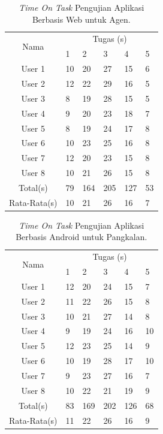 \begin{table}[H]
	\center
	\caption{\textit{Time On Task} Pengujian Aplikasi Berbasis Web untuk Agen.}
	\label{timeOnTaskAgen}
	\begin{tabular}{|c|l|l|l|l|l|}
		\hline
		\multirow{2}{*}{Nama} & \multicolumn{5}{c|}{Tugas (s)} \\ \cline{2-6} 
		&1 &2  &3 &4 &5  \\
		\hline
		User 1 &10 &20 &27 &15 &6  \\ 
		\hline
		User 2 &12 &22 &29 &16 &5  \\ 
		\hline
		User 3 &8 &19 &28 &15 &5  \\ 
		\hline
		User 4 &9 &20 &23 &18 &7  \\ 
		\hline
		User 5 &8 &19 &24 &17 &8  \\ 
		\hline
		User 6 &10 &23 &25 &16 &8 \\ 
		\hline
		User 7 &12 &20 &23 &15 &8  \\ 
		\hline
		User 8 &10 &21 &26 &15 &8  \\ 
		\hline
		Total(s)  &79 &164 &205 &127 &53 \\ 
		\hline
		Rata-Rata(s)  &10 &21 &26 &16 &7  \\ 
		\hline
	\end{tabular}
\end{table}

\begin{table}[H]
	\center
	\caption{\textit{Time On Task} Pengujian Aplikasi Berbasis Android untuk Pangkalan.}
	\label{timeOnTaskPangkalan}
	\begin{tabular}{|c|l|l|l|l|l|}
		\hline
		\multirow{2}{*}{Nama} & \multicolumn{5}{c|}{Tugas (s)} \\ \cline{2-6} 
		&1 &2  &3 &4 &5  \\
		\hline
		User 1 &12 &20 &24 &15 &7  \\ 
		\hline
		User 2 &11 &22 &26 &15 &8  \\ 
		\hline
		User 3 &10 &21 &27 &14 &8  \\ 
		\hline
		User 4 &9 &19 &24 &16 &10  \\ 
		\hline
		User 5 &12 &23 &25 &14 &9  \\ 
		\hline
		User 6 &10 &19 &28 &17 &10 \\ 
		\hline
		User 7 &9 &23 &27 &16 &7  \\ 
		\hline
		User 8 &10 &22 &21 &19 &9  \\ 
		\hline
		Total(s)  &83 &169 &202 &126 &68 \\ 
		\hline
		Rata-Rata(s)  &11 &22 &26 &16 &9  \\ 
		\hline
	\end{tabular}
\end{table}

